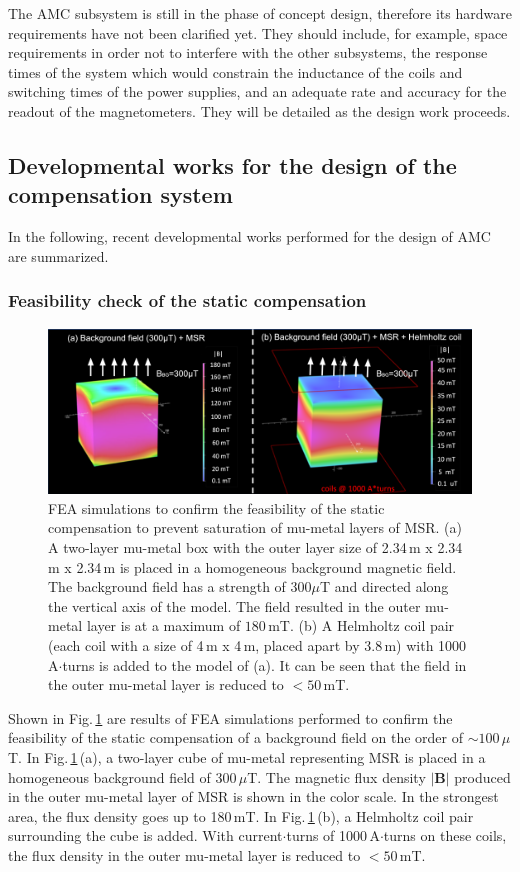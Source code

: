 The AMC subsystem is still in the phase of concept design, therefore its hardware requirements have not been clarified yet. 
They should include, for example, space requirements in order not to interfere with the other subsystems, the response times of the system which would constrain the inductance of the coils and switching times of the power supplies, and an adequate rate and accuracy for the readout of the magnetometers. They will be detailed as the design work proceeds. 

\subsection{Developmental works for the design of the compensation system}

In the following, recent developmental works performed for the design of AMC are summarized. 

\subsubsection{Feasibility check of the static compensation}\label{sec:amc_feasibility}
\begin{figure}[htb]
  \centering
  \includegraphics[width=\textwidth]{graphics/AMC/feasibility.png}
  \caption{FEA simulations to confirm the feasibility of the static compensation to prevent saturation of mu-metal layers of MSR. (a) A two-layer mu-metal box with the outer layer size of 2.34\,m x 2.34\,m x 2.34\,m is placed in a homogeneous background magnetic field. The background field has a strength of $300 \mu$T and directed along the vertical axis of the model. The field resulted in the outer mu-metal layer is at a maximum of $180\,$mT. (b) A Helmholtz coil pair (each coil with a size of 4\,m x 4\,m, placed apart by 3.8\,m) with 1000 A$\cdot$turns is added to the model of (a). It can be seen that the field in the outer mu-metal layer is reduced to $<50\,$mT.  }
  \label{fig:amc_feasibility}
\end{figure}
Shown in Fig.\,\ref{fig:amc_feasibility} are results of FEA simulations performed to confirm the feasibility of the static compensation of a background field on the order of $\sim 100\,\mu$T. In Fig.\,\ref{fig:amc_feasibility}\,(a), a two-layer cube of mu-metal representing MSR is placed in a homogeneous background field of $300\,\mu$T. The magnetic flux density $|\mathbf{B}|$ produced in the outer mu-metal layer of MSR is shown in the color scale. In the strongest area, the flux density goes up to 180\,mT. In Fig.\,\ref{fig:amc_feasibility}\,(b), a Helmholtz coil pair surrounding the cube is added. With current$\cdot$turns of 1000\,A$\cdot$turns on these coils, the flux density in the outer mu-metal layer is reduced to $<50$\,mT.

